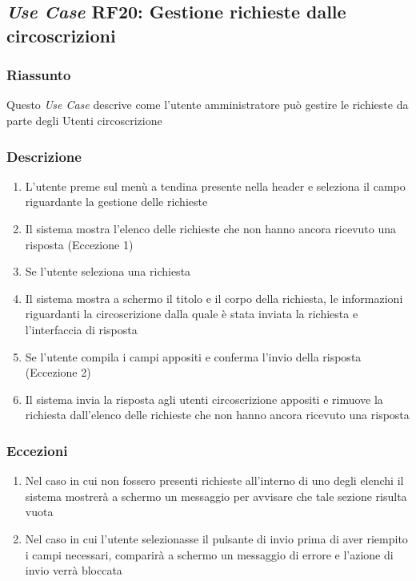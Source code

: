     \subsection{\textit{Use Case} RF20: Gestione richieste dalle circoscrizioni}
        \subsubsection{Riassunto}
            Questo \textit{Use Case} descrive come l'utente amministratore può gestire le richieste da parte degli Utenti circoscrizione
        \subsubsection{Descrizione}
            \begin{enumerate}
                \item L'utente preme sul menù a tendina presente nella header e seleziona il campo riguardante la gestione delle richieste
                \item Il sistema mostra l'elenco delle richieste che non hanno ancora ricevuto una risposta (Eccezione 1)
                \item Se l'utente seleziona una richiesta
                \item Il sistema mostra a schermo il titolo e il corpo della richiesta, le informazioni riguardanti la circoscrizione dalla quale è stata inviata la richiesta e l'interfaccia di risposta
                \item Se l'utente compila i campi appositi e conferma l'invio della risposta (Eccezione 2)
                \item Il sistema invia la risposta agli utenti circoscrizione appositi e rimuove la richiesta dall'elenco delle richieste che non hanno ancora ricevuto una risposta
            \end{enumerate}
        \subsubsection{Eccezioni}
            \begin{enumerate}
                \item Nel caso in cui non fossero presenti richieste all'interno di uno degli elenchi il sistema mostrerà a schermo un messaggio per avvisare che tale sezione risulta vuota
                \item Nel caso in cui l'utente selezionasse il pulsante di invio prima di aver riempito i campi necessari, comparirà a schermo un messaggio di errore e l'azione di invio verrà bloccata
            \end{enumerate}

